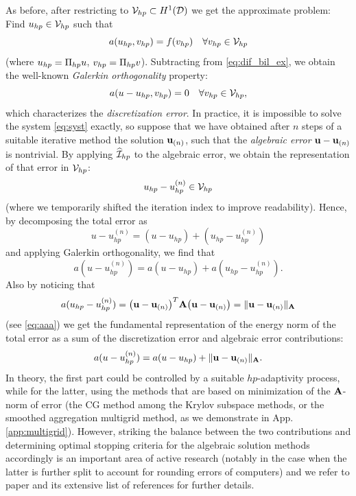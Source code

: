 As before, after restricting to $\Space_{hp} \subset
H^1(\VV)$ we get the approximate problem:
Find $u_{hp}\in \Space_{hp}$ such that
$$
	a(u_{hp}, v_{hp}) = f(v_{hp}) \quad \forall v_{hp} \in \Space_{hp}
$$
(where $u_{hp} = \Projop[hp] u$, $v_{hp} = \Projop[hp] v$). Subtracting from \eqref{eq:dif_bil_ex}, we obtain the
well-known \textit{Galerkin orthogonality} property:
$$
	a(u - u_{hp}, v_{hp}) = 0	\quad \forall v_{hp}\in \Space_{hp},
$$
which characterizes the \textit{discretization error}. In practice, it is impossible to solve the system \eqref{eq:syst}
exactly, so suppose that we have obtained after $n$ steps of a suitable iterative method the solution $\mat{u}_{(n)}$,
such that the \textit{algebraic error} $\mat{u} - \mat{u}_{(n)}$ is nontrivial. By applying $\PihHP$ to the algebraic
error, we obtain the representation of that error in $\Space_{hp}$: 
$$
	u_{hp} - u_{hp}^{(n)} \in \Space_{hp}
$$
(where we temporarily shifted the iteration index to improve readability).
Hence, by decomposing the total error as
$$
	u - u_{hp}^{(n)} = (u-u_{hp}) + (u_{hp}-u_{hp}^{(n)})
$$
and applying Galerkin orthogonality, we find that
$$
	a(u - u_{hp}^{(n)}) = a(u-u_{hp}) + a(u_{hp}-u_{hp}^{(n)}).
$$
Also by noticing that 
$$
	a(u_{hp}-u_{hp}^{(n)}) = \bigl(\mat{u} - \mat{u}_{(n)}\bigr)^T\mat{A}\bigl(\mat{u} - \mat{u}_{(n)}\bigr) =
	\norm[\mat{A}]{\mat{u} - \mat{u}_{(n)}} $$
(see \eqref{eq:aaa})
we get the fundamental representation of the energy norm of the total error as a sum of the discretization error and
algebraic error contributions:
$$
	a(u - u_{hp}^{(n)}) = a(u-u_{hp}) + \norm[\mat{A}]{\mat{u} - \mat{u}_{(n)}}.
$$
In theory, the first part could be controlled by a suitable $hp$-adaptivity process, while for the latter, using the
methods that are based on minimization of the $\mat{A}$-norm of error (the CG method among the Krylov subspace methods,
or the smoothed aggregation multigrid method, as we demonstrate in App. \ref{app:multigrid}). However, striking the
balance between the two contributions and determining optimal stopping criteria for the algebraic solution methods accordingly is an important area of active research (notably in the case when the latter is further split to account for rounding errors of 
computers) and we refer to paper \cite{Arilie} and its extensive list of references for further details.

